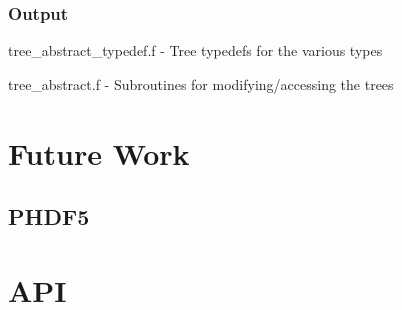 \documentclass{article}
\begin{document}
\subsubsection{Output}
\begin{list}{}{}
\item tree\_abstract\_typedef.f - Tree typedefs for the various types
\item tree\_abstract.f - Subroutines for modifying/accessing the trees
\end{list}

\section{Future Work}
\subsection{PHDF5}

\section{API}
\end{document}
